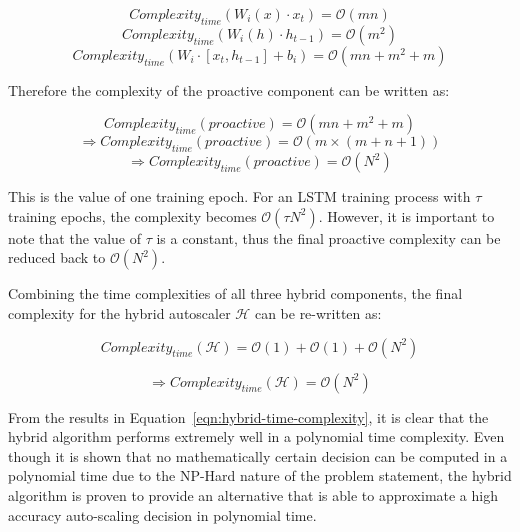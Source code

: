 \[Complexity_{time}(W_{i}(x) \cdot x_{t}) = \mathcal{O}(mn)\]
\[Complexity_{time}(W_{i}(h) \cdot h_{t-1}) = \mathcal{O}(m^2)\]
\begin{equation}
    Complexity_{time}(W_{i} \cdot [x_{t}, h_{t-1}] + b_{i}) = \mathcal{O}(mn + m^2 + m)
\end{equation}

Therefore the complexity of the proactive component can be written as:

\[Complexity_{time}(proactive) = \mathcal{O}(mn + m^2 + m)\]
\[\Rightarrow Complexity_{time}(proactive) = \mathcal{O}(m \times (m + n + 1))\]
\begin{equation}
    \Rightarrow Complexity_{time}(proactive) = \mathcal{O}(N^2)
\end{equation}

This is the value of one training epoch. For an LSTM training process with $\tau$ training epochs, the complexity becomes $\mathcal{O}(\tau N^2)$. However, it is important to note that the value of $\tau$ is a constant, thus the final proactive complexity can be reduced back to $\mathcal{O}(N^2)$.\par

Combining the time complexities of all three hybrid components, the final complexity for the hybrid autoscaler $\mathcal{H}$ can be re-written as:

\[Complexity_{time}(\mathcal{H}) = \mathcal{O}(1) +  \mathcal{O}(1) + \mathcal{O}(N^2)\]

\begin{equation}
    \label{eqn:hybrid-time-complexity}
    \Rightarrow Complexity_{time}(\mathcal{H}) = \mathcal{O}(N^2)
\end{equation}

From the results in Equation~\ref{eqn:hybrid-time-complexity}, it is clear that the hybrid algorithm performs extremely well in a polynomial time complexity. Even though it is shown that no mathematically certain decision can be computed in a polynomial time due to the NP-Hard nature of the problem statement, the hybrid algorithm is proven to provide an alternative that is able to approximate a high accuracy auto-scaling decision in polynomial time.